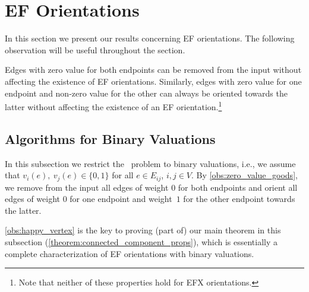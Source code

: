 \section{EF Orientations}\label{section:EFo}

In this section we present our results concerning EF orientations. The following observation will be useful throughout the section.


\begin{observation}\label{obs:zero_value_goods}
    Edges with zero value for both endpoints can be removed from the input without affecting the existence of EF orientations.
    Similarly, edges with zero value for one endpoint and non-zero value for the other can always be oriented towards the latter without affecting the existence of an EF orientation.\footnote{Note that neither of these properties hold for EFX orientations.}
\end{observation}



\subsection{Algorithms for Binary Valuations}\label{subsec:EFo:linear}



In this subsection we restrict the \EFo\ problem to binary valuations, i.e., we assume that $v_i(e),\ v_j(e) \in \{0,1\}$ for all $e\in E_{ij}$, $i,j\in V$.
By \cref{obs:zero_value_goods}, we remove from the input all edges of weight $0$ for both endpoints and orient all edges of weight $0$ for one endpoint and weight~$1$ for the other endpoint towards the latter.


\cref{obs:happy_vertex} is the key to proving (part of) our main theorem in this subsection (\cref{theorem:connected_component_props}), which is essentially a complete characterization of EF orientations with binary valuations.

